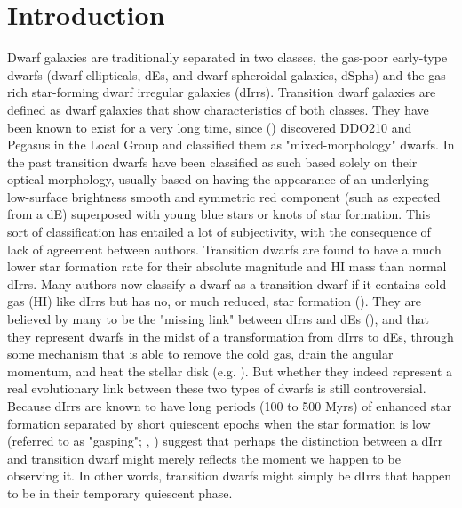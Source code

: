 \documentclass[12pt,preprint]{emulateapj}
\begin{document}

\section{Introduction}

Dwarf galaxies are traditionally separated in two classes, the gas-poor early-type dwarfs (dwarf ellipticals, dEs, and dwarf spheroidal galaxies, dSphs) 
and the gas-rich star-forming dwarf irregular galaxies (dIrrs). Transition dwarf galaxies are defined as dwarf galaxies that show characteristics of both
classes. They have been known to exist for a very long time, since (\cite{vdb59}) discovered DDO210 and Pegasus in the Local Group and classified 
them as "mixed-morphology" dwarfs. In the past transition dwarfs have been classified as such based solely on their optical morphology, usually based 
on having the appearance of an underlying low-surface brightness smooth and symmetric red component (such as expected from a dE) superposed 
with young blue stars or knots of star formation. This sort of classification has entailed a lot of subjectivity, with the consequence of lack of agreement 
between authors. Transition dwarfs are found to have a much lower star formation rate for their absolute magnitude and HI mass than normal dIrrs. 
Many authors now classify a dwarf as a transition dwarf if it contains cold gas (HI) like dIrrs but has no, or much reduced, star formation 
(\cite{m98,ggh03,scm03a,cds09}). They are believed by many to be the "missing link" between dIrrs and dEs (\cite{hhmh97,ksg99,li13}), and that they 
represent dwarfs in the midst of a transformation from dIrrs to dEs, through some mechanism that is able to remove the cold gas, drain the angular 
momentum, and heat the stellar disk (e.g. \cite{scm03a}). But whether they indeed represent a real evolutionary link between these two types of dwarfs 
is still controversial. Because dIrrs are known to have long periods (100 to 500 Myrs) of enhanced star formation separated by short quiescent epochs 
when the star formation is low (referred to as "gasping"; \cite{t91}, \cite{mcc12}) suggest that perhaps the distinction between a dIrr and transition dwarf 
might merely reflects the moment we happen to be observing it. In other words, transition dwarfs might simply be dIrrs that happen to be in their temporary 
quiescent phase.
\end{document}
